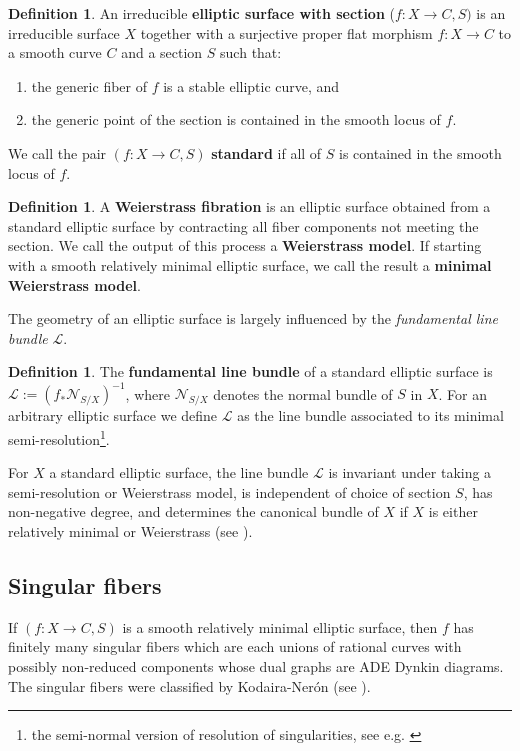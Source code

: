 \documentclass[11pt]{amsart}
\theoremstyle{definition}
\newtheorem{definition}[theorem]{Definition}
\theoremstyle{remark}
\begin{document}
	
	
	\begin{definition}
		An irreducible \textbf{elliptic surface with section} ($f: X \to C, S)$ is an irreducible surface $X$ together with a surjective proper flat morphism $f: X \to C$ to a smooth curve $C$ and a section $S$ such that:
		\begin{enumerate} 
			\item the generic fiber of $f$ is a stable elliptic curve, and
			\item the generic point of the section is contained in the smooth locus of $f$. 
		\end{enumerate}
		We call the pair $(f: X \to C, S)$ \textbf{standard} if all of $S$ is contained in the smooth locus of $f$.\end{definition}
	
	\begin{definition}\label{def:weierstrassmodel} A \textbf{Weierstrass fibration} is an elliptic surface obtained from a standard elliptic surface by contracting all fiber components not meeting the section. We call the output of this process a \textbf{Weierstrass model}. If starting with a smooth relatively minimal elliptic surface, we call the result a \textbf{minimal Weierstrass model}.  \end{definition}
	
	The geometry of an elliptic surface is largely influenced by the \emph{fundamental line bundle} $\mathscr L$.
	
	\begin{definition} The \textbf{fundamental line bundle} of a standard elliptic surface is $\mathscr L := (f_* \mathcal{N}_{S/X})^{-1}$, where $\mathcal{N}_{S/X}$ denotes the normal bundle of $S$ in $X$. For an arbitrary elliptic surface we define $\mathscr{L}$ as the line bundle associated to its minimal semi-resolution\footnote{the semi-normal version of resolution of singularities, see e.g. \cite[Section 1.13]{singmmp}}. \end{definition}
	
	For $X$ a standard elliptic surface, the line bundle $\mathscr{L}$ is invariant under taking a semi-resolution or Weierstrass model, is independent of choice of section $S$, has non-negative degree, and determines the canonical bundle of $X$ if $X$ is either relatively minimal or Weierstrass (see \cite[III.1.1]{mir3}). 
	
	\subsection{Singular fibers} If $(f: X \to C, S)$ is a smooth relatively minimal elliptic surface, then $f$ has finitely many singular fibers which are each unions of rational curves with possibly non-reduced components whose dual graphs are ADE Dynkin diagrams. The singular fibers were classified by Kodaira-Ner\'on (see \cite[Section V.7]{complexsurfaces}). 
	
\end{document}
